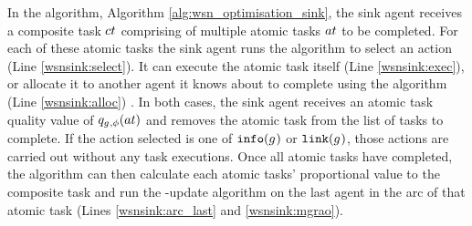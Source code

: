 In the \acronymWSNOptimisationSink{}{} algorithm, Algorithm \ref{alg:wsn_optimisation_sink}, the sink agent receives a composite task $\varCompositeTask{}{}$ comprising of multiple atomic tasks $\varAtomicTask{}{}$ to be completed. For each of these atomic tasks the sink agent runs the \acronymATARIA{}{} algorithm to select an action (Line \ref{wsnsink:select}). It can execute the atomic task itself (Line \ref{wsnsink:exec}), or allocate it to another agent it knows about to complete using the \acronymWSNOptimisationArc{}{} algorithm (Line \ref{wsnsink:alloc}) . In both cases, the sink agent receives an atomic task quality value of $\functionAtomicTaskQualitySignature{}{}$ and removes the atomic task from the list of tasks to complete. If the action selected is one of $\texttt{info}(g_{}^{})$ or $\texttt{link}(g_{}^{})$, those actions are carried out without any task executions. Once all atomic tasks have completed, the algorithm can then calculate each atomic tasks' proportional value to the composite task  and run the \acronymMGRAO{}{}-update algorithm on the last agent in the arc of that atomic task (Lines \ref{wsnsink:arc_last} and \ref{wsnsink:mgrao}). 


